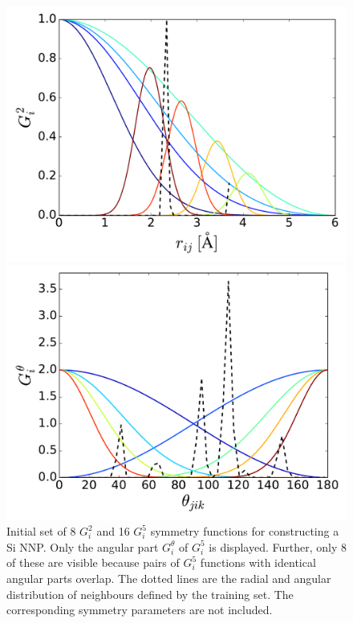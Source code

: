 \documentclass[twoside,english]{uiofysmaster}
\begin{document}
\begin{figure}
 \begin{minipage}{0.48\linewidth}
  \includegraphics[width=\textwidth]{Figures/Results/SiInitialSymmG2.pdf}
 \end{minipage}
\quad
\begin{minipage}{0.48\linewidth}
 \includegraphics[width=\textwidth]{Figures/Results/SiInitialSymmG5.pdf}
\end{minipage} 
  \caption{Initial set of 8 $G_i^2$ and 16 $G_i^5$ symmetry functions for constructing a Si NNP. Only the angular part $G_i^\theta$ of 
           $G_i^5$ is displayed. Further, only 8 of these are visible because pairs of $G_i^5$ functions with identical
           angular parts overlap. 
           The dotted lines are the radial and angular distribution of neighbours defined 
           by the training set. The corresponding symmetry parameters are not included. }
  \label{fig:SiInitialSymmSet}
\end{figure}
\end{document}
